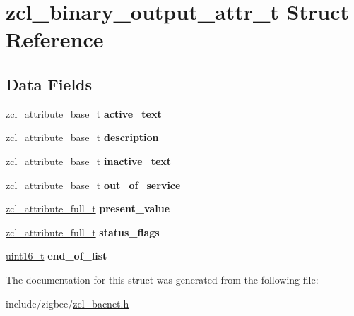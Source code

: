 \hypertarget{structzcl__binary__output__attr__t}{}\section{zcl\+\_\+binary\+\_\+output\+\_\+attr\+\_\+t Struct Reference}
\label{structzcl__binary__output__attr__t}
\subsection*{Data Fields}
\begin{DoxyCompactItemize}
\item 
\mbox{\label{structzcl__binary__output__attr__t_a553fa88586bb1363dab7de87542fc2eb}} 
\hyperlink{structzcl__attribute__base__t}{zcl\+\_\+attribute\+\_\+base\+\_\+t} {\bfseries active\+\_\+text}
\item 
\mbox{\label{structzcl__binary__output__attr__t_a182d10de1c0759d95a8a660af1cc8680}} 
\hyperlink{structzcl__attribute__base__t}{zcl\+\_\+attribute\+\_\+base\+\_\+t} {\bfseries description}
\item 
\mbox{\label{structzcl__binary__output__attr__t_a98d315857b484ac9b45c0d63a2ad3f3f}} 
\hyperlink{structzcl__attribute__base__t}{zcl\+\_\+attribute\+\_\+base\+\_\+t} {\bfseries inactive\+\_\+text}
\item 
\mbox{\label{structzcl__binary__output__attr__t_a5973642ae212fd359977211923a6875b}} 
\hyperlink{structzcl__attribute__base__t}{zcl\+\_\+attribute\+\_\+base\+\_\+t} {\bfseries out\+\_\+of\+\_\+service}
\item 
\mbox{\label{structzcl__binary__output__attr__t_a4b3f698bcaa87726019c831614021664}} 
\hyperlink{structzcl__attribute__full__t}{zcl\+\_\+attribute\+\_\+full\+\_\+t} {\bfseries present\+\_\+value}
\item 
\mbox{\label{structzcl__binary__output__attr__t_a231d8fff6a85e7824504bfd8d83de174}} 
\hyperlink{structzcl__attribute__full__t}{zcl\+\_\+attribute\+\_\+full\+\_\+t} {\bfseries status\+\_\+flags}
\item 
\mbox{\label{structzcl__binary__output__attr__t_a2066d4a3853d4b0d8de8b162f829e10f}} 
\hyperlink{group__hal__dos_ga5a8b2dc9e45a9ee81a94ef304fb62505}{uint16\+\_\+t} {\bfseries end\+\_\+of\+\_\+list}
\end{DoxyCompactItemize}


The documentation for this struct was generated from the following file\+:\begin{DoxyCompactItemize}
\item 
include/zigbee/\hyperlink{zcl__bacnet_8h}{zcl\+\_\+bacnet.\+h}\end{DoxyCompactItemize}

